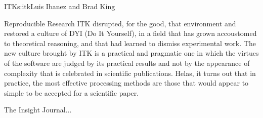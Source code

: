 \begin{aosachapter}{ITK}{s:itk}{Luis Ibanez and Brad King}
\begin{aosasect1}{Reproducible Research}
ITK disrupted, for the good, that environment and restored a culture
of DYI (Do It Yourself), in a field that has grown accoustomed to
theoretical reasoning, and that had learned to dismiss experimental
work. The new culture brought by ITK is a practical and pragmatic one
in which the virtues of the software are judged by its practical results
and not by the appearance of complexity that is celebrated in scientific
publications. Helas, it turns out that in practice, the most effective
processing methods are those that would appear to simple to be accepted
for a scientific paper.

The Insight Journal...
\end{aosasect1}

\end{aosachapter}
